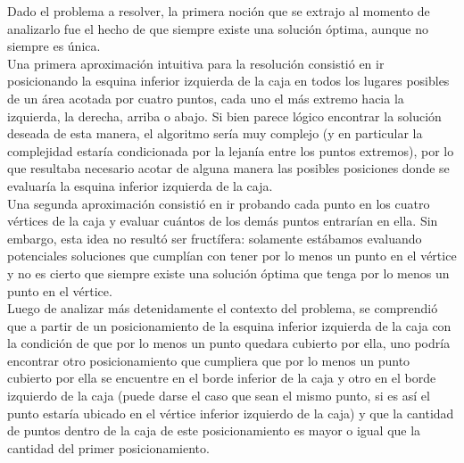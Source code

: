 \indent Dado el problema a resolver, la primera noci\'on que se extrajo al momento de analizarlo fue el hecho de que siempre existe una soluci\'on \'optima, aunque no siempre es \'unica.\\
\indent Una primera aproximaci\'on intuitiva para la resoluci\'on consisti\'o en ir posicionando la esquina inferior izquierda de la caja en todos los lugares posibles de un \'area acotada por cuatro puntos, cada uno el m\'as extremo hacia la izquierda, la derecha, arriba o abajo. Si bien parece l\'ogico encontrar la soluci\'on deseada de esta manera, el algoritmo ser\'ia muy complejo (y en particular la complejidad estar\'ia condicionada por la lejan\'ia entre los puntos extremos), por lo que resultaba necesario acotar de alguna manera las posibles posiciones donde se evaluar\'ia la esquina inferior izquierda de la caja.\\
\indent Una segunda aproximaci\'on consisti\'o en ir probando cada punto en los cuatro v\'ertices de la caja y evaluar cu\'antos de los dem\'as puntos entrar\'ian en ella. Sin embargo, esta idea no result\'o ser fruct\'ifera: solamente est\'abamos evaluando potenciales soluciones que cumpl\'ian con tener por lo menos un punto en el v\'ertice y no es cierto que siempre existe una soluci\'on \'optima que tenga por lo menos un punto en el v\'ertice.\\
\indent Luego de analizar m\'as detenidamente el contexto del problema, se comprendi\'o que a partir de un posicionamiento de la esquina inferior izquierda de la caja con la condici\'on de que por lo menos un punto quedara cubierto por ella, uno podr\'ia encontrar otro posicionamiento que cumpliera que por lo menos un punto cubierto por ella se encuentre en el borde inferior de la caja y otro en el borde izquierdo de la caja (puede darse el caso que sean el mismo punto, si es así el punto estar\'ia ubicado en el v\'ertice inferior izquierdo de la caja) y que la cantidad de puntos dentro de la caja de este posicionamiento es mayor o igual que la cantidad del primer posicionamiento.\\
 								

